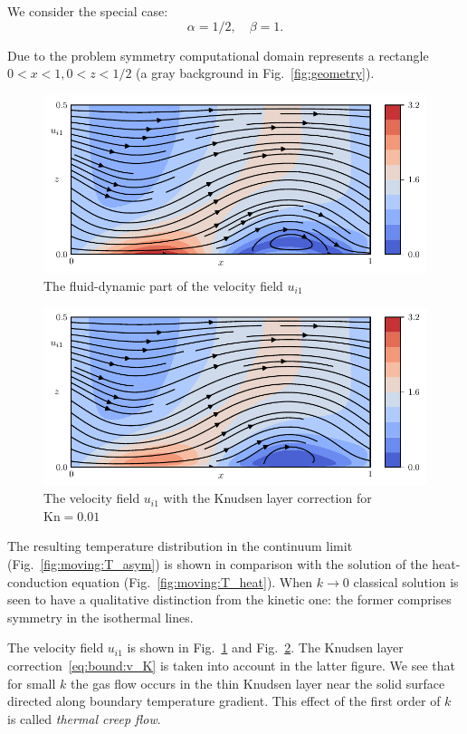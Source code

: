 \documentclass[smallextended, referee]{svjour3} %
\newcommand{\Kn}{\mathrm{Kn}}
\begin{document}
We consider the special case:
\[ \alpha=1/2, \quad \beta = 1. \]

Due to the problem symmetry computational domain represents a rectangle \(0<x<1, 0<z<1/2\)
(a gray background in Fig.~\ref{fig:geometry}).

\begin{figure}
	\centering
	\includegraphics{Fig5}
	\caption{The fluid-dynamic part of the velocity field \(u_{i1}\)}\label{fig:moving:fluid}
\end{figure}

\begin{figure}
	\centering
	\includegraphics{Fig6}
	\caption{The velocity field \(u_{i1}\) with the Knudsen layer correction for \(\Kn=0.01\)}\label{fig:moving:kn001}
\end{figure}

The resulting temperature distribution in the continuum limit (Fig.~\ref{fig:moving:T_asym}) is shown
in comparison with the solution of the heat-conduction equation (Fig.~\ref{fig:moving:T_heat}).
When \(k\to0\) classical solution is seen to have a qualitative distinction from the kinetic one: 
the former comprises symmetry in the isothermal lines.

The velocity field \(u_{i1}\) is shown in Fig.~\ref{fig:moving:fluid} and Fig.~\ref{fig:moving:kn001}.
The Knudsen layer correction~\eqref{eq:bound:v_K} is taken into account in the latter figure.
We see that for small \(k\) the gas flow occurs in the thin Knudsen layer near the solid surface
directed along boundary temperature gradient.
This effect of the first order of \(k\) is called \textit{thermal creep flow}.
\end{document}
